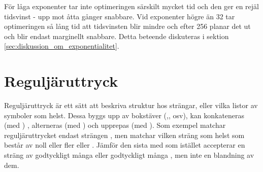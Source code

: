 \documentclass[Rapport]{subfiles}
\begin{document}
För låga exponenter tar inte optimeringen särskilt mycket tid och
den ger en rejäl tidsvinst - upp mot åtta gånger snabbare.
Vid exponenter högre än 32 tar optimeringen så lång tid att tidsvinsten
blir mindre och efter 256 planar det ut och blir endast marginellt snabbare.
Detta beteende diskuteras i sektion \ref{sec:diskussion_om_exponentialitet}.

\section{Reguljäruttryck}

Reguljäruttryck är ett sätt att beskriva struktur hos strängar, eller vilka
listor av symboler som helst. Dessa byggs upp av bokstäver
(,, osv), 
kan konkateneras (med ) 
, alterneras (med \ic{|})
 och upprepas (med \ic{*}). 
Som exempel matchar reguljäruttrycket  endast strängen ,
men  matchar vilken sträng som helst som består av noll eller fler
 eller . Jämför den sista med  som istället accepterar
en sträng av godtyckligt många  eller godtyckligt många , men inte 
en blandning av dem.
\end{document}
